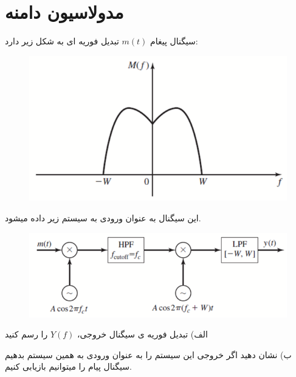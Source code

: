 \section{مدولاسیون دامنه}

سیگنال پیغام $m(t)$ تبدیل فوریه ای به شکل زیر دارد:

\begin{figure}[h]
	\centering
	\includegraphics*[width=0.5\linewidth]{pics/q3_1.png}
\end{figure}

این سیگنال به عنوان ورودی به سیستم زیر داده میشود.

\begin{figure}[h]
	\centering
	\includegraphics*[width=0.6\linewidth]{pics/q3_2.png}
\end{figure}

الف) تبدیل فوریە ی سیگنال خروجی، $Y(f)$ را رسم کنید

ب) نشان دهید اگر خروجی این سیستم را به عنوان ورودی به همین سیستم بدهیم سیگنال پیام را میتوانیم بازیابی کنیم.

